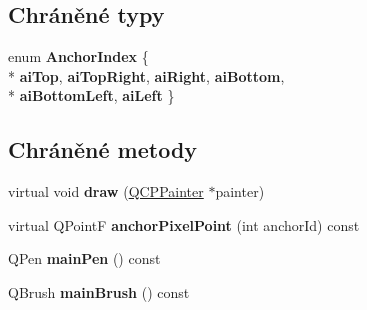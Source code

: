 \subsection*{Chráněné typy}
\begin{DoxyCompactItemize}
\item 
\hypertarget{classQCPItemRect_af0ebba58e6bca4851c4db726691ec0d3}{}enum {\bfseries Anchor\+Index} \{ \\*
{\bfseries ai\+Top}, 
{\bfseries ai\+Top\+Right}, 
{\bfseries ai\+Right}, 
{\bfseries ai\+Bottom}, 
\\*
{\bfseries ai\+Bottom\+Left}, 
{\bfseries ai\+Left}
 \}\label{classQCPItemRect_af0ebba58e6bca4851c4db726691ec0d3}

\end{DoxyCompactItemize}
\subsection*{Chráněné metody}
\begin{DoxyCompactItemize}
\item 
\hypertarget{classQCPItemRect_a18cd583638b876cdd50f1a155ec182aa}{}virtual void {\bfseries draw} (\hyperlink{classQCPPainter}{Q\+C\+P\+Painter} $\ast$painter)\label{classQCPItemRect_a18cd583638b876cdd50f1a155ec182aa}

\item 
\hypertarget{classQCPItemRect_ae0973f8281fb52361b0c99ee899be07e}{}virtual Q\+Point\+F {\bfseries anchor\+Pixel\+Point} (int anchor\+Id) const \label{classQCPItemRect_ae0973f8281fb52361b0c99ee899be07e}

\item 
\hypertarget{classQCPItemRect_afa0fb7c6328a1e197ecd537de36daf8f}{}Q\+Pen {\bfseries main\+Pen} () const \label{classQCPItemRect_afa0fb7c6328a1e197ecd537de36daf8f}

\item 
\hypertarget{classQCPItemRect_ab0bd8e272e822ec851ba5b0c20e9200e}{}Q\+Brush {\bfseries main\+Brush} () const \label{classQCPItemRect_ab0bd8e272e822ec851ba5b0c20e9200e}

\end{DoxyCompactItemize}

